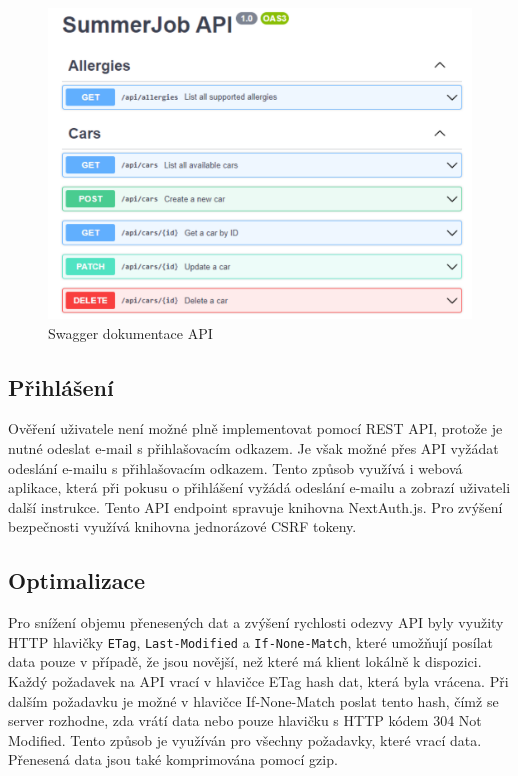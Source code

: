 \begin{figure}[h]
    \centering
    \includegraphics[width=1\textwidth]{chapters/images/swagger.pdf}
    \caption{Swagger dokumentace API}
    \label{fig:swagger}
\end{figure}

\subsection{Přihlášení}

Ověření uživatele není možné plně implementovat pomocí REST API, protože je nutné odeslat e-mail s přihlašovacím odkazem.
Je však možné přes API vyžádat odeslání e-mailu s přihlašovacím odkazem. Tento způsob využívá i webová aplikace, která při pokusu o přihlášení
vyžádá odeslání e-mailu a zobrazí uživateli další instrukce. Tento API endpoint spravuje knihovna NextAuth.js. Pro zvýšení bezpečnosti využívá knihovna
jednorázové CSRF tokeny. 

\subsection{Optimalizace}

Pro snížení objemu přenesených dat a zvýšení rychlosti odezvy API byly využity HTTP hlavičky \texttt{ETag}, \texttt{Last-Modified} a \texttt{If-None-Match}, které umožňují
posílat data pouze v případě, že jsou novější, než které má klient lokálně k dispozici.
Každý požadavek na API vrací v hlavičce ETag hash dat, která byla vrácena. Při dalším požadavku je možné v hlavičce If-None-Match poslat tento hash,
čímž se server rozhodne, zda vrátí data nebo pouze hlavičku s HTTP kódem 304 Not Modified. Tento způsob je využíván pro všechny požadavky, které vrací data.
Přenesená data jsou také komprimována pomocí gzip.


